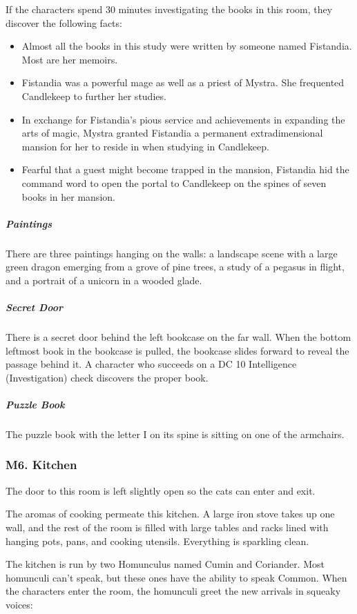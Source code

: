 \documentclass[10pt,a4paper,twoside,bg=print,twocolumn,openany,nodeprecatedcode]{dndbook}
\begin{document}
If the characters spend 30 minutes investigating the books in this room, they discover the following facts:


\begin{itemize}
\item Almost all the books in this study were written by someone named Fistandia. Most are her memoirs.
\item Fistandia was a powerful mage as well as a priest of Mystra. She frequented Candlekeep to further her studies.
\item In exchange for Fistandia's pious service and achievements in expanding the arts of magic, Mystra granted Fistandia a permanent extradimensional mansion for her to reside in when studying in Candlekeep.
\item Fearful that a guest might become trapped in the mansion, Fistandia hid the command word to open the portal to Candlekeep on the spines of seven books in her mansion.
\end{itemize}

\subparagraph{Paintings}
There are three paintings hanging on the walls: a landscape scene with a large green dragon emerging from a grove of pine trees, a study of a pegasus in flight, and a portrait of a unicorn in a wooded glade.

\subparagraph{Secret Door}
There is a secret door behind the left bookcase on the far wall. When the bottom leftmost book in the bookcase is pulled, the bookcase slides forward to reveal the passage behind it. A character who succeeds on a DC 10 Intelligence (Investigation) check discovers the proper book.

\subparagraph{Puzzle Book}
The puzzle book with the letter I on its spine is sitting on one of the armchairs.

\subsubsection{M6. Kitchen}
The door to this room is left slightly open so the cats can enter and exit.

\begin{DndReadAloud}{}
The aromas of cooking permeate this kitchen. A large iron stove takes up one wall, and the rest of the room is filled with large tables and racks lined with hanging pots, pans, and cooking utensils. Everything is sparkling clean.

\end{DndReadAloud}

The kitchen is run by two Homunculus named Cumin and Coriander. Most homunculi can't speak, but these ones have the ability to speak Common. When the characters enter the room, the homunculi greet the new arrivals in squeaky voices:
\end{document}
